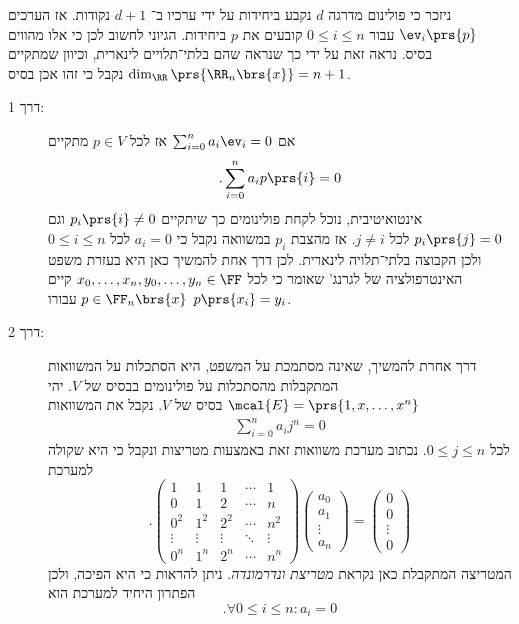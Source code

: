 \documentclass[a4paper,10pt,twoside,openany]{book}
\begin{document}
\begin{solution}
ניזכר כי פולינום
מדרגה
$d$
נקבע ביחידות על ידי ערכיו ב־%
$d+1$
נקודות. אז הערכים
$\ev_i\prs{p}$
עבור
$0 \leq i \leq n$
קובעים את
$p$
ביחידות. הגיוני לחשוב לכן כי אלו מהווים בסיס. נראה זאת על ידי כך שנראה שהם בלתי־תלויים לינארית, וכיוון שמתקיים
$\dim_\RR\prs{\RR_n\brs{x}} = n+1$
נקבל כי זהו אכן בסיס.

\begin{description}
\item[דרך 1:]
אם
$\sum_{i=0}^n a_i \ev_i = 0$
אז לכל
$p \in V$
מתקיים
\begin{align*}
\text{.} \sum_{i=0}^n a_i p\prs{i} = 0
\end{align*}
אינטואיטיבית, נוכל לקחת פולינומים כך שיתקיים
$p_i\prs{i} \neq 0$
וגם
$p_i\prs{j} = 0$
לכל
$j \neq i$.
אז מהצבת
$p_i$
במשוואה נקבל כי
$a_i = 0$
לכל
$0 \leq i \leq n$
ולכן הקבוצה בלתי־תלויה לינארית.
לכן דרך אחת להמשיך כאן היא בעזרת משפט האינטרפולציה של לגרנג' שאומר כי לכל
$x_0, \ldots, x_n, y_0, \ldots, y_n \in \FF$
קיים
$p \in \FF_n\brs{x}$
עבורו
$p\prs{x_i} = y_i$.

\item[דרך 2:]

דרך אחרת להמשיך, שאינה מסתמכת על המשפט, היא הסתכלות על המשוואות המתקבלות מהסתכלות על פולינומים בבסיס של
$V$.
יהי
$\mcal{E} = \prs{1, x, \ldots, x^n}$
בסיס של
$V$.
נקבל את המשוואות
\begin{align*}
\sum_{i=0}^n a_i j^n = 0
\end{align*}
לכל
$0 \leq j \leq n$.
נכתוב מערכת משוואות זאת באמצעות מטריצות ונקבל כי היא שקולה למערכת
\[
\text{.} \begin{pmatrix}
1 & 1 & 1 & \cdots & 1 \\
0 & 1 & 2 & \cdots & n \\
0^2 & 1^2 & 2^2 & \cdots & n^2 \\
\vdots & \vdots & \vdots & \ddots & \vdots \\
0^n & 1^n & 2^n & \cdots & n^n
\end{pmatrix}
\begin{pmatrix}
a_0 \\
a_1 \\
\vdots \\
a_n
\end{pmatrix}
=
\begin{pmatrix}
0 \\
0 \\
\vdots \\
0
\end{pmatrix}
\]
המטריצה המתקבלת כאן נקראת
\emph{מטריצת ונדרמונדה}.
ניתן להראות כי היא הפיכה, ולכן הפתרון היחיד למערכת הוא
\[\text{.} \forall 0 \leq i \leq n: a_i = 0\]


\end{description}
\end{solution}
\end{document}
